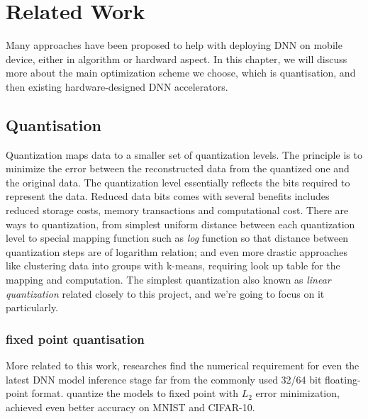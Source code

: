 \chapter{Related Work}
\label{ch:related_work}
Many approaches have been proposed to help with deploying DNN on mobile device, either in algorithm or hardward aspect. In this chapter, we will discuss more about the main optimization scheme we choose, which is quantisation, and then existing hardware-designed DNN accelerators.
\section{Quantisation}
Quantization maps data to a smaller set of quantization levels. The principle is to minimize the error between the reconstructed data from the quantized one and the original data. The quantization level essentially reflects the bits required to represent the data. Reduced data bits comes with several benefits includes reduced storage costs, memory transactions and computational cost. There are ways to quantization, from simplest uniform distance between each quantization level to special mapping function such as \textit{log} function so that distance between quantization steps are of logarithm relation; and even more drastic approaches like clustering data into groups with k-means, requiring look up table for the mapping and computation. The simplest quantization also known as \textit{linear quantization} related closely to this project, and we're going to focus on it particularly. 
\subsection{fixed point quantisation}
More related to this work, researches find the numerical requirement for even the latest DNN model inference stage far from the commonly used 32/64 bit floating-point format. \cite{FixedPoint} quantize the models to fixed point with ${L_2}$ error minimization, achieved even better accuracy on MNIST and CIFAR-10. 
